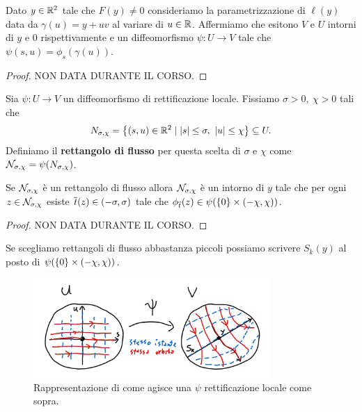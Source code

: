 \begin{lemma}\label{LemmaRettificazioneLocale}
Dato $y\in\mathbb{R}^2$ tale che $F(y)\neq 0$ consideriamo la parametrizzazione di $\ell(y)$ data da $\gamma(u)=y+uv$ al variare di $u\in\mathbb{R}$.
Affermiamo che esitono $V$ e $U$ intorni di $y$ e $0$ rispettivamente e un diffeomorfismo $\psi:U\to V$ tale che $\psi(s,u)=\phi_s(\gamma(u))$.
\end{lemma}
\begin{proof}
NON DATA DURANTE IL CORSO.
\end{proof}

\begin{definition}
Sia $\psi:U\to V$ un diffeomorfismo di rettificazione locale. Fissiamo $\sigma>0,\ \chi>0$ tali che
\[N_{\sigma,\chi}=\left\{{(s,u)\in \mathbb{R}^2\mid |s|\leq \sigma,\ |u|\leq \chi}\right\}\subseteq U.\]
Definiamo il \textbf{rettangolo di flusso} per questa scelta di $\sigma$ e $\chi$ come $\mathcal{N}_{\sigma,\chi}=\psi(N_{\sigma,\chi})$.
\end{definition}

\begin{lemma}\label{LemmaRettangoliFlusso}
Se $\mathcal{N}_{\sigma,\chi}$ \`e un rettangolo di flusso allora $\mathcal{N}_{\sigma,\chi}$ \`e un intorno di $y$ tale che per ogni $z\in \mathcal{N}_{\sigma,\chi}$ esiste $\overline{t}(z)\in (-\sigma,\sigma)$ tale che $\phi_{\overline{t}}(z)\in \psi(\left\{{0}\right\}\times (-\chi,\chi))$.
\end{lemma}
\begin{proof}
NON DATA DURANTE IL CORSO.
\end{proof}
\begin{remark}
Se scegliamo rettangoli di flusso abbastanza piccoli possiamo scrivere $S_k(y)$ al posto di $\psi(\left\{{0}\right\}\times (-\chi,\chi))$.
\end{remark}

\begin{figure}[!htb]
    \centering
    \includegraphics[width=9cm]{Immagini/rettificazione_locale.png}
    \caption{Rappresentazione di come agisce una $\psi$ rettificazione locale come sopra.}
\end{figure}


